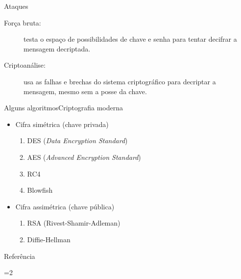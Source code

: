 \begin{frame}{Ataques}

\begin{description}

\item[For\c{c}a bruta:] testa o espa\c{c}o de possibilidades de chave e senha para tentar 
decifrar a mensagem decriptada.

\item[Criptoan\'{a}lise:] usa as falhas e brechas do sistema criptogr\'{a}fico para decriptar 
a mensagem, mesmo sem a posse da chave.
\end{description}
\end{frame}

\begin{frame}{Alguns algoritmos}{Criptografia moderna}

  \begin{itemize}[<+-| alert@+>]
  \item Cifra simétrica (chave privada)
    \begin{enumerate}
    \item DES ({\it Data Encryption Standard})
    \item AES ({\it Advanced Encryption Standard})
    \item RC4
    \item Blowfish
    \end{enumerate}

  \item Cifra assimétrica (chave pública)
    \begin{enumerate}
    \item RSA (Rivest-Shamir-Adleman)
    \item Diffie-Hellman
    \end{enumerate}

  \end{itemize}
  
\end{frame}

\begin{frame}{Referência}
  \biblioref
\end{frame}  

=2


\frame{\title{\insertlecture}\maketitle}


